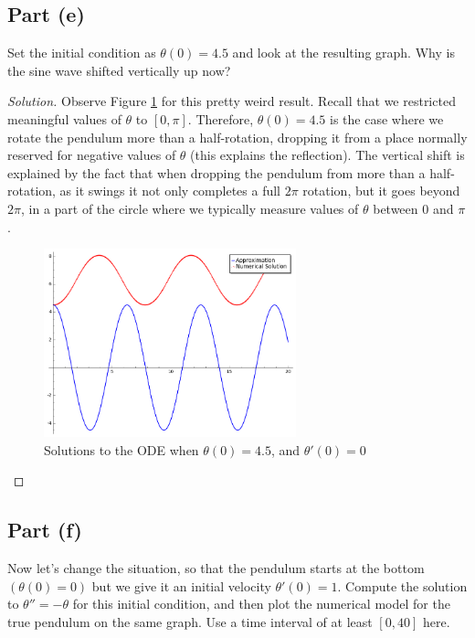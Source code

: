 \documentclass[letterpaper, 12pt]{amsart}
\theoremstyle{definition}  							%
\begin{document}
		\subsection*{Part (e)}
		Set the initial condition as $\theta(0) = 4.5$ and look at the resulting graph. 
		Why is the sine wave shifted vertically up now?

		\begin{proof}[Solution]
		Observe Figure \ref{theta45} for this pretty weird result.
		Recall that we restricted meaningful values of $\theta$ to $[0,\pi]$.
		Therefore, $\theta(0)=4.5$ is the case where we rotate the pendulum more than a half-rotation, dropping it from a place normally reserved for negative values of $\theta$ (this explains the reflection).
		The vertical shift is explained by the fact that when dropping the pendulum from more than a half-rotation, as it swings it not only completes a full $2\pi$ rotation, but it goes beyond $2\pi$, in a part of the circle where we typically measure values of $\theta$ between $0$ and $\pi$.

		\begin{figure}[b]
			\includegraphics[width=0.65\textwidth]{images/theta45.png}
			\caption{Solutions to the ODE when $\theta(0)=4.5$, and $\theta'(0)=0$}
			\label{theta45}
		\end{figure}
		\end{proof}

		\subsection*{Part (f)}
		Now let’s change the situation, so that the pendulum starts at the bottom $(\theta(0) = 0)$ but we give it an initial velocity $\theta'(0) = 1$. 
		Compute the solution to $\theta'' = -\theta$ for this initial condition, and then plot the numerical model for the true pendulum on the same graph. 
		Use a time interval of at least $[0, 40]$ here.
\end{document}
